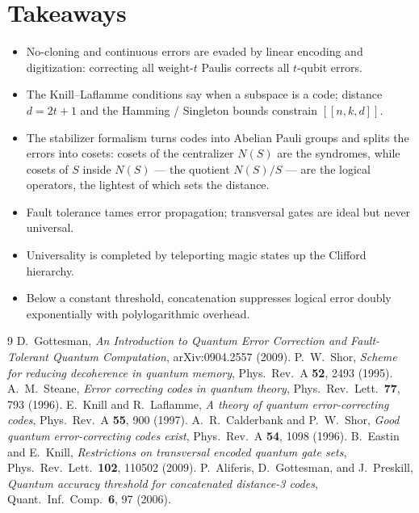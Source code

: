 \documentclass[11pt]{article}
\theoremstyle{plain}
\begin{document}
\section*{Takeaways}
\begin{itemize}[leftmargin=*]
  \item No-cloning and continuous errors are evaded by linear encoding and digitization: correcting
  all weight-$t$ Paulis corrects all $t$-qubit errors.
  \item The Knill--Laflamme conditions say when a subspace is a code; distance $d=2t+1$ and the
  Hamming / Singleton bounds constrain $[[n,k,d]]$.
  \item The stabilizer formalism turns codes into Abelian Pauli groups and splits the errors into
  cosets: cosets of the centralizer $N(S)$ are the syndromes, while cosets of $S$ inside $N(S)$ ---
  the quotient $N(S)/S$ --- are the logical operators, the lightest of which sets the distance.
  \item Fault tolerance tames error propagation; transversal gates are ideal but never universal.
  \item Universality is completed by teleporting magic states up the Clifford hierarchy.
  \item Below a constant threshold, concatenation suppresses logical error doubly exponentially with
  polylogarithmic overhead.
\end{itemize}

\begin{thebibliography}{9}
 D.\ Gottesman, \emph{An Introduction to Quantum Error Correction and Fault-Tolerant
  Quantum Computation}, arXiv:0904.2557 (2009).
 P.\ W.\ Shor, \emph{Scheme for reducing decoherence in quantum memory},
  Phys.\ Rev.\ A \textbf{52}, 2493 (1995).
 A.\ M.\ Steane, \emph{Error correcting codes in quantum theory},
  Phys.\ Rev.\ Lett.\ \textbf{77}, 793 (1996).
 E.\ Knill and R.\ Laflamme, \emph{A theory of quantum error-correcting codes},
  Phys.\ Rev.\ A \textbf{55}, 900 (1997).
 A.\ R.\ Calderbank and P.\ W.\ Shor, \emph{Good quantum error-correcting codes exist},
  Phys.\ Rev.\ A \textbf{54}, 1098 (1996).
 B.\ Eastin and E.\ Knill, \emph{Restrictions on transversal encoded quantum gate sets},
  Phys.\ Rev.\ Lett.\ \textbf{102}, 110502 (2009).
 P.\ Aliferis, D.\ Gottesman, and J.\ Preskill, \emph{Quantum accuracy threshold for
  concatenated distance-3 codes}, Quant.\ Inf.\ Comp.\ \textbf{6}, 97 (2006).
\end{thebibliography}
\end{document}

